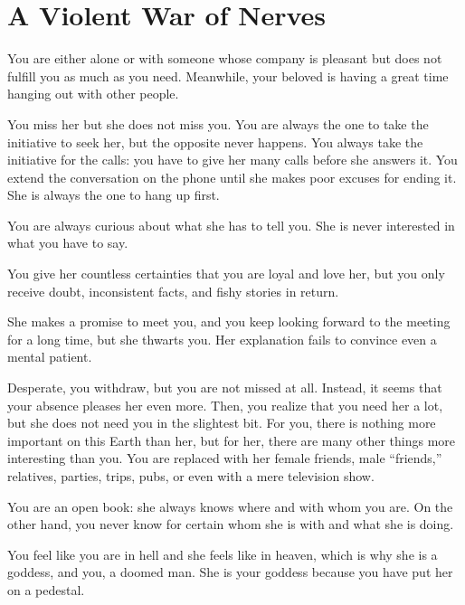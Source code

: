 \section{A Violent War of Nerves}

\par You are either alone or with someone whose company is pleasant but does not fulfill you as much as you need. Meanwhile, your beloved is having a great time hanging out with other people.

\par You miss her but she does not miss you. You are always the one to take the initiative to seek her, but the opposite never happens. You always take the initiative for the calls: you have to give her many calls before she answers it. You extend the conversation on the phone until she makes poor excuses for ending it. She is always the one to hang up first.

\par You are always curious about what she has to tell you. She is never interested in what you have to say.

\par You give her countless certainties that you are loyal and love her, but you only receive doubt, inconsistent facts, and fishy stories in return.

\par She makes a promise to meet you, and you keep looking forward to the meeting for a long time, but she thwarts you. Her explanation fails to convince even a mental patient.

\par Desperate, you withdraw, but you are not missed at all. Instead, it seems that your absence pleases her even more. Then, you realize that you need her a lot, but she does not need you in the slightest bit. For you, there is nothing more important on this Earth than her, but for her, there are many other things more interesting than you. You are replaced with her female friends, male \enquote{friends,} relatives, parties, trips, pubs, or even with a mere television show.

\par You are an open book: she always knows where and with whom you are. On the other hand, you never know for certain whom she is with and what she is doing.

\par You feel like you are in hell and she feels like in heaven, which is why she is a goddess, and you, a doomed man. She is your goddess because you have put her on a pedestal.

